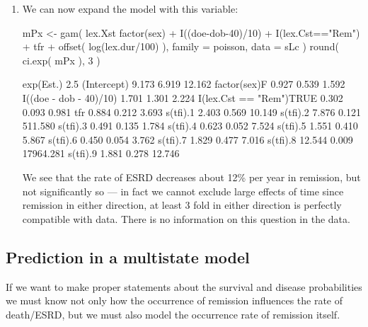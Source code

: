 \begin{enumerate}[resume]
\item We can now expand the model with this variable:
\begin{Schunk}
\begin{Sinput}
 mPx <- gam( lex.Xst %in% EP ~ s( tfi, k=10 ) +
                    factor(sex) + I((doe-dob-40)/10) +  
                    I(lex.Cst=="Rem") + tfr +
                    offset( log(lex.dur/100) ),
             family = poisson, 
               data = sLc )
 round( ci.exp( mPx ), 3 )
\end{Sinput}
\begin{Soutput}
                        exp(Est.)  2.5%     97.5%
(Intercept)                 9.173 6.919    12.162
factor(sex)F                0.927 0.539     1.592
I((doe - dob - 40)/10)      1.701 1.301     2.224
I(lex.Cst == "Rem")TRUE     0.302 0.093     0.981
tfr                         0.884 0.212     3.693
s(tfi).1                    2.403 0.569    10.149
s(tfi).2                    7.876 0.121   511.580
s(tfi).3                    0.491 0.135     1.784
s(tfi).4                    0.623 0.052     7.524
s(tfi).5                    1.551 0.410     5.867
s(tfi).6                    0.450 0.054     3.762
s(tfi).7                    1.829 0.477     7.016
s(tfi).8                   12.544 0.009 17964.281
s(tfi).9                    1.881 0.278    12.746
\end{Soutput}
\end{Schunk}
We see that the rate of ESRD decreases about 12\% per year in
remission, but not significantly so --- in fact we cannot exclude
large effects of time since remission in either direction, at least 3
fold in either direction is perfectly compatible with data. There is
no information on this question in the data. 

\end{enumerate}

\subsection{Prediction in a multistate model}


If we want to make proper statements about the survival and disease
probabilities we must know not only how the occurrence of remission
influences the rate of death/ESRD, but we must also model the
occurrence rate of remission itself.

